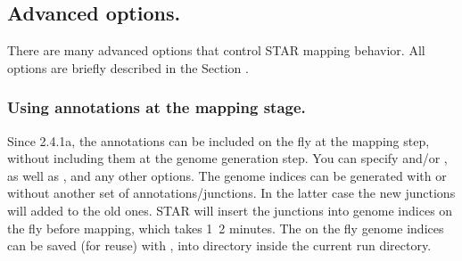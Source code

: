 \documentclass[12pt]{article}
\begin{document}
\subsection{Advanced options.}
There are many advanced options that control STAR mapping behavior. All options are briefly described in the Section . 

\subsubsection{Using annotations at the mapping stage.}
Since 2.4.1a, the annotations can  be included on the fly at the mapping step, without including them at the genome generation step. You can specify   and/or  , as well as , and any other  options. The genome indices can be generated with or  without another set of annotations/junctions. In the latter case the new junctions will added to the old ones. STAR will insert the junctions into genome indices on the fly before mapping, which takes 1~2 minutes. The on the fly genome indices can be saved (for reuse) with  , into  directory inside the current run directory.
\end{document}
